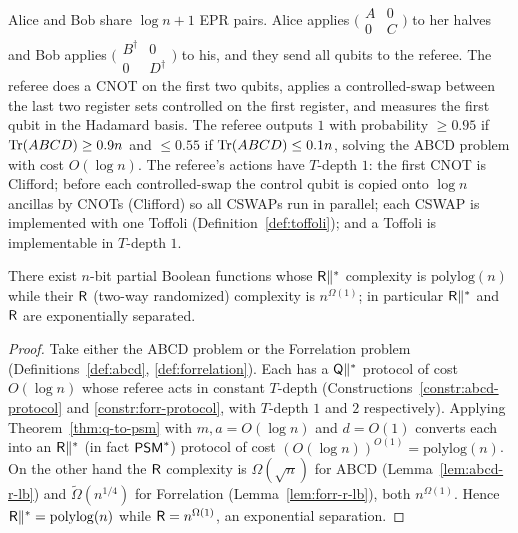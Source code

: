 \begin{construction}
  \label{constr:abcd-protocol}
  Alice and Bob share $\log n + 1$ EPR pairs. Alice applies
  $\bigl(\begin{smallmatrix} A & 0 \\ 0 & C \end{smallmatrix}\bigr)$ to her halves
  and Bob applies
  $\bigl(\begin{smallmatrix} B^\dagger & 0 \\ 0 & D^\dagger \end{smallmatrix}\bigr)$
  to his, and they send all qubits to the referee. The referee does a CNOT on the
  first two qubits, applies a controlled-swap between the last two register sets
  controlled on the first register, and measures the first qubit in the Hadamard
  basis. The referee outputs $1$ with probability $\ge 0.95$ if $\operatorname{Tr}(ABCD)\ge0.9n$
  and $\le 0.55$ if $\operatorname{Tr}(ABCD)\le0.1n$, solving the ABCD problem with cost
  $O(\log n)$. The referee's actions have $T$-depth $1$: the first CNOT is
  Clifford; before each controlled-swap the control qubit is copied onto
  $\log n$ ancillas by CNOTs (Clifford) so all CSWAPs run in parallel; each CSWAP
  is implemented with one Toffoli (Definition~\ref{def:toffoli}); and a Toffoli is
  implementable in $T$-depth $1$.
\end{construction}

\begin{theorem}
  \label{thm:separation-rpar-r}
  There exist $n$-bit partial Boolean functions whose $\mathsf{R}\|^{*}$ complexity is
  $\mathrm{polylog}(n)$ while their $\mathsf{R}$ (two-way randomized) complexity is
  $n^{\Omega(1)}$; in particular $\mathsf{R}\|^{*}$ and $\mathsf{R}$ are exponentially
  separated.
\end{theorem}
\begin{proof}
  Take either the ABCD problem or the Forrelation problem
  (Definitions~\ref{def:abcd}, \ref{def:forrelation}). Each has a $\mathsf{Q}\|^{*}$
  protocol of cost $O(\log n)$ whose referee acts in constant $T$-depth
  (Constructions~\ref{constr:abcd-protocol} and \ref{constr:forr-protocol},
  with $T$-depth $1$ and $2$ respectively). Applying Theorem~\ref{thm:q-to-psm}
  with $m, a = O(\log n)$ and $d = O(1)$ converts each into an $\mathsf{R}\|^{*}$ (in fact
  $\mathsf{PSM}^{*}$) protocol of cost $(O(\log n))^{O(1)} = \mathrm{polylog}(n)$. On the
  other hand the $\mathsf{R}$ complexity is $\Omega(\sqrt n)$ for ABCD
  (Lemma~\ref{lem:abcd-r-lb}) and $\tilde\Omega(n^{1/4})$ for Forrelation
  (Lemma~\ref{lem:forr-r-lb}), both $n^{\Omega(1)}$. Hence $\mathsf{R}\|^{*} =
  \mathrm{polylog}(n)$ while $\mathsf{R} = n^{\Omega(1)}$, an exponential separation.
\end{proof}
